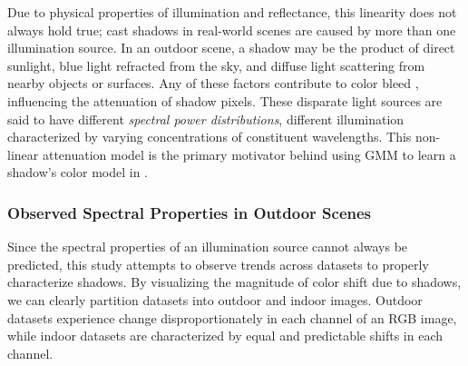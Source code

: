 Due to physical properties of illumination and reflectance, this linearity does not always hold true; cast shadows in real-world scenes are caused by more than one illumination source. In an outdoor scene, a shadow may be the product of direct sunlight, blue light refracted from the sky, and diffuse light scattering from nearby objects or surfaces. Any of these factors contribute to color bleed \cite{huang2009moving}, influencing the attenuation of shadow pixels. These disparate light sources are said to have different \textit{spectral power distributions}, different illumination characterized by varying concentrations of constituent wavelengths. This non-linear attenuation model is the primary motivator behind using GMM to learn a shadow's color model in \cite{huang2009moving}.

\FloatBarrier
\subsubsection{Observed Spectral Properties in Outdoor Scenes} \label{section:spectralprop}

Since the spectral properties of an illumination source cannot always be predicted, this study attempts to observe trends across datasets to properly characterize shadows. By visualizing the magnitude of color shift due to shadows, we can clearly partition datasets into outdoor and indoor images. Outdoor datasets experience change disproportionately in each channel of an RGB image, while indoor datasets are characterized by equal and predictable shifts in each channel.


